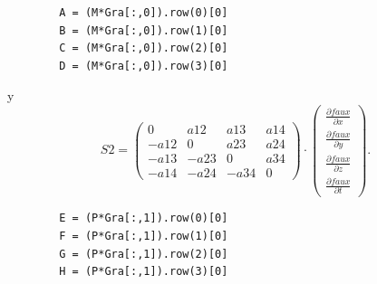 \documentclass[a4paper,10pt]{book}
\begin{document}
\begin{lstlisting}
        A = (M*Gra[:,0]).row(0)[0]
        B = (M*Gra[:,0]).row(1)[0]
        C = (M*Gra[:,0]).row(2)[0]
        D = (M*Gra[:,0]).row(3)[0]
\end{lstlisting}
y\\
\[ S2 = \left( \begin{array}{cccc}
              0   & a12  & a13  & a14  \\
             -a12 & 0    & a23  & a24  \\
             -a13 & -a23 & 0    & a34  \\
             -a14 & -a24 & -a34 & 0   
             \end{array}
   \right) \cdot \left( \begin{array}{c}
               			\frac{\partial faux}{\partial x} \\
               			\frac{\partial faux}{\partial y} \\ 
               			\frac{\partial faux}{\partial z} \\
               			\frac{\partial faux}{\partial t} 
                   		\end{array}
                 \right).\] 
\begin{lstlisting}  
        E = (P*Gra[:,1]).row(0)[0]        
        F = (P*Gra[:,1]).row(1)[0]
        G = (P*Gra[:,1]).row(2)[0]
        H = (P*Gra[:,1]).row(3)[0]
\end{lstlisting}    
\end{document}
